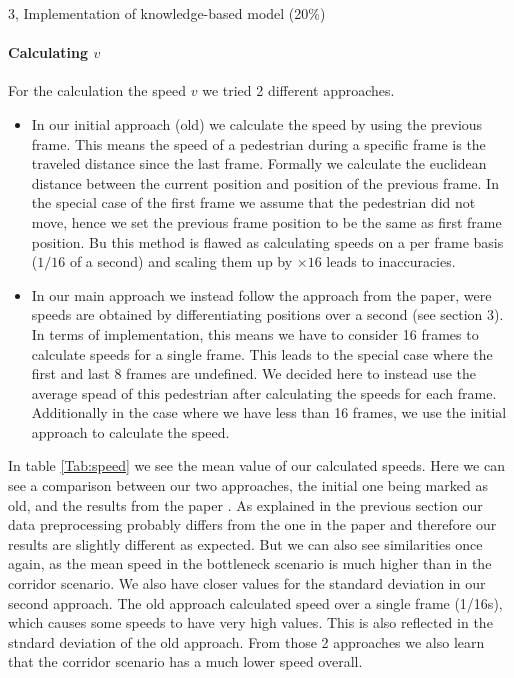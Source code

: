 \begin{task}{3, Implementation of knowledge-based model (20\%)}
\paragraph{Calculating $v$} For the calculation the speed $v$ we tried 2 different approaches.
\begin{itemize}
    \item In our initial approach (old) we calculate the speed by using the previous frame. This means the speed of a pedestrian during a specific frame is the traveled distance since the last frame. Formally we calculate the euclidean distance between the current position and position of the previous frame. In the special case of the first frame we assume that the pedestrian did not move, hence we set the previous frame position to be the same as first frame position. Bu this method is flawed as calculating speeds on a per frame basis ($1/16$ of a second) and scaling them up by $\times 16$ leads to inaccuracies.
    \item In our main approach we instead follow the approach from the paper, were speeds are obtained by differentiating positions over a second (see \cite{tordeux2020prediction} section 3). In terms of implementation, this means we have to consider 16 frames to calculate speeds for a single frame. This leads to the special case where the first and last 8 frames are undefined. We decided here to instead use the average spead of this pedestrian after calculating the speeds for each frame. Additionally in the case where we have less than 16 frames, we use the initial approach to calculate the speed.
\end{itemize}

In table \ref{Tab:speed} we see the mean value of our calculated speeds. Here we can see a comparison between our two approaches, the initial one being marked as old, and the results from the paper \cite{tordeux2020prediction}. As explained in the previous section our data preprocessing probably differs from the one in the paper and therefore our results are slightly different as expected. But we can also see similarities once again, as the mean speed in the bottleneck scenario is much higher than in the corridor scenario. We also have closer values for the standard deviation in our second approach. The old approach calculated speed over a single frame (1/16s), which causes some speeds to have very high values. This is also reflected in the stndard deviation of the old approach. From those 2 approaches we also learn that the corridor scenario has a much lower speed overall.


\end{task}
